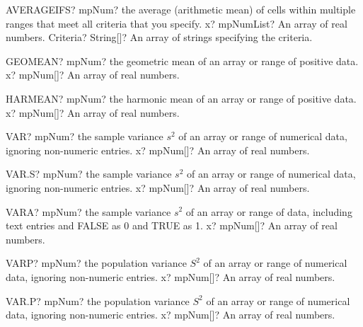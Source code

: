 \documentclass[12pt,a4paper,openany]{book}
\begin{document}
\begin{mpFunctionsExtract}
\mpWorksheetFunctionTwoNotImplemented
{AVERAGEIFS? mpNum? the average (arithmetic mean) of cells within multiple ranges that meet all criteria that you specify.}
{x? mpNumList? An array of real numbers.}
{Criteria? String[]? An array of strings specifying the criteria.}
\end{mpFunctionsExtract}

\begin{mpFunctionsExtract}
\mpWorksheetFunctionOneNotImplemented
{GEOMEAN? mpNum? the geometric mean of an array or range of positive data.}
{x? mpNum[]? An array of real numbers.}
\end{mpFunctionsExtract}

\begin{mpFunctionsExtract}
\mpWorksheetFunctionOneNotImplemented
{HARMEAN? mpNum? the harmonic mean of an array or range of positive data.}
{x? mpNum[]? An array of real numbers.}
\end{mpFunctionsExtract}

\begin{mpFunctionsExtract}
\mpWorksheetFunctionOneNotImplemented
{VAR? mpNum? the sample variance $s^2$ of an array or range of numerical data, ignoring non-numeric entries.}
{x? mpNum[]? An array of real numbers.}
\end{mpFunctionsExtract}

\begin{mpFunctionsExtract}
\mpWorksheetFunctionOneNotImplemented
{VAR.S? mpNum? the sample variance $s^2$ of an array or range of numerical data, ignoring non-numeric entries.}
{x? mpNum[]? An array of real numbers.}
\end{mpFunctionsExtract}

\begin{mpFunctionsExtract}
\mpWorksheetFunctionOneNotImplemented
{VARA? mpNum? the sample variance $s^2$ of an array or range of data, including text entries and FALSE as 0 and TRUE as 1.}
{x? mpNum[]? An array of real numbers.}
\end{mpFunctionsExtract}

\begin{mpFunctionsExtract}
\mpWorksheetFunctionOneNotImplemented
{VARP? mpNum? the population variance $S^2$ of an array or range of numerical data, ignoring non-numeric entries.}
{x? mpNum[]? An array of real numbers.}
\end{mpFunctionsExtract}

\begin{mpFunctionsExtract}
\mpWorksheetFunctionOneNotImplemented
{VAR.P? mpNum? the population variance $S^2$ of an array or range of numerical data, ignoring non-numeric entries.}
{x? mpNum[]? An array of real numbers.}
\end{mpFunctionsExtract}
\end{document}
